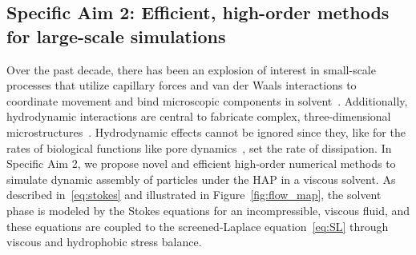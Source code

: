 \subsection{Specific Aim 2: Efficient, high-order methods for
large-scale simulations}
\label{sec:specificaim2}
Over the past decade, there has been an explosion of interest in
small-scale processes that utilize capillary forces and van der Waals
interactions to coordinate movement and bind microscopic components in
solvent~\cite{Pandey2011, Zhang2017, Siontorou2017}. Additionally,
hydrodynamic interactions are central to fabricate complex,
three-dimensional microstructures~\cite{Dasgupta2017, Leong2007,
Reynolds2019, Cho2010}. Hydrodynamic effects cannot be ignored since
they, like for the rates of biological functions like pore
dynamics~\cite{RYHAM20112929}, set the rate of dissipation. In Specific
Aim 2, we propose novel and efficient high-order numerical methods to
simulate dynamic assembly of particles under the HAP in a viscous
solvent. As described in~\eqref{eq:stokes} and illustrated in
Figure~\ref{fig:flow_map}, the solvent phase is modeled by the Stokes
equations for an incompressible, viscous fluid, and these equations are
coupled to the screened-Laplace equation~\eqref{eq:SL} through viscous
and hydrophobic stress balance. 
 
